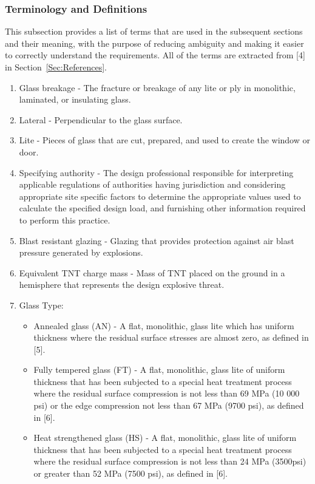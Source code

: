 \documentclass[12pt]{article}
\begin{document}
\subsubsection{Terminology and Definitions}
\label{Sec:TermDefs}
This subsection provides a list of terms that are used in the subsequent sections and their meaning, with the purpose of reducing ambiguity and making it easier to correctly understand the requirements. All of the terms are extracted from {[}4{]} in Section~\ref{Sec:References}.
\begin{enumerate}
\item{Glass breakage - The fracture or breakage of any lite or ply in monolithic, laminated, or insulating glass.}
\item{Lateral - Perpendicular to the glass surface.}
\item{Lite - Pieces of glass that are cut, prepared, and used to create the window or door.}
\item{Specifying authority - The design professional responsible for interpreting applicable regulations of authorities having jurisdiction and considering appropriate site specific factors to determine the appropriate values used to calculate the specified design load, and furnishing other information required to perform this practice.}
\item{Blast resistant glazing - Glazing that provides protection against air blast pressure generated by explosions.}
\item{Equivalent TNT charge mass - Mass of TNT placed on the ground in a hemisphere that represents the design explosive threat.}
\item{Glass Type:}
\begin{itemize}
\item{Annealed glass (AN) - A flat, monolithic, glass lite which has uniform thickness where the residual surface stresses are almost zero, as defined in [5].}
\item{Fully tempered glass (FT) - A flat, monolithic, glass lite of uniform thickness that has been subjected to a special heat treatment process where the residual surface compression is not less than 69 MPa (10 000 psi) or the edge compression not less than 67 MPa (9700 psi), as defined in [6].}
\item{Heat strengthened glass (HS) - A flat, monolithic, glass lite of uniform thickness that has been subjected to a special heat treatment process where the residual surface compression is not less than 24 MPa (3500psi) or greater than 52 MPa (7500 psi), as defined in [6].}

\end{itemize}
\end{enumerate}
\end{document}

